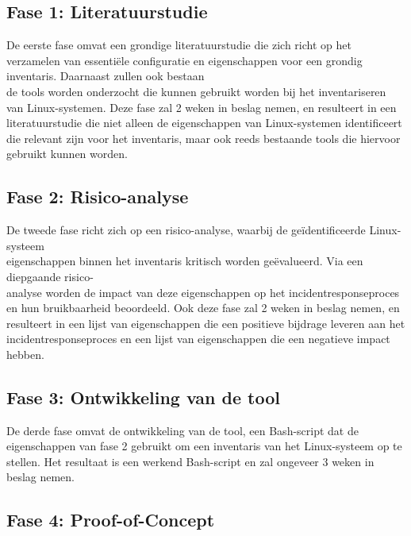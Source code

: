 \subsection{Fase 1: Literatuurstudie}%
\label{sub:literatuurstudie}

De eerste fase omvat een grondige literatuurstudie die zich richt op het verzamelen van essenti\"ele configuratie en eigenschappen voor een grondig inventaris.
Daarnaast zullen ook bestaan\\de tools worden onderzocht die kunnen gebruikt worden bij het inventariseren van Linux-systemen.
Deze fase zal 2 weken in beslag nemen, en resulteert in een literatuurstudie die niet alleen de  eigenschappen van Linux-systemen identificeert die relevant zijn voor het inventaris, maar ook reeds bestaande tools die hiervoor gebruikt kunnen worden.

\subsection{Fase 2: Risico-analyse}%
\label{sub:risico_analyse}

De tweede fase richt zich op een risico-analyse, waarbij de ge\"identificeerde Linux-systeem\\eigenschappen binnen het inventaris kritisch worden ge\"evalueerd.
Via een diepgaande risico-\\analyse worden de impact van deze eigenschappen op het incidentresponseproces en hun bruikbaarheid beoordeeld.
Ook deze fase zal 2 weken in beslag nemen, en resulteert in een lijst van eigenschappen die een positieve bijdrage leveren aan het incidentresponseproces en een lijst van eigenschappen die een negatieve impact hebben.

\subsection{Fase 3: Ontwikkeling van de tool}%
\label{sub:ontwikkeling_van_de_tool}

De derde fase omvat de ontwikkeling van de tool, een Bash-script dat de eigenschappen van fase 2 gebruikt om een inventaris van het Linux-systeem op te stellen.
Het resultaat is een werkend Bash-script en zal ongeveer 3 weken in beslag nemen.

\subsection{Fase 4: Proof-of-Concept}%
\label{sub:proof_of_concept}

